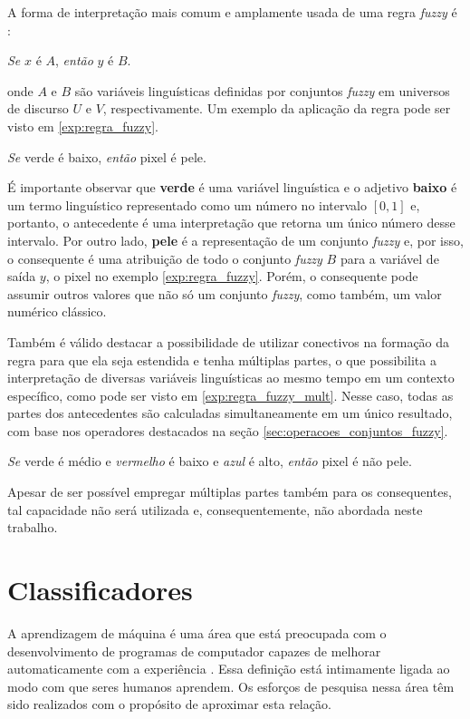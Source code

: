 A forma de interpretação mais comum e amplamente usada de uma regra \emph{fuzzy} é \citep{dubois:96}:
\begin{center}
\emph{Se} $x$ é $A$, \emph{então} $y$ é $B$.
\end{center}
\noindent onde $A$ e $B$ são variáveis linguísticas definidas por conjuntos \emph{fuzzy} em universos de discurso $U$ e $V$, respectivamente. Um exemplo da aplicação da regra pode ser visto em \ref{exp:regra_fuzzy}.

\begin{exmp}
\label{exp:regra_fuzzy}
\emph{Se} verde é baixo, \emph{então} pixel é pele.
\end{exmp}

É importante observar que \textbf{verde} é uma variável linguística e o adjetivo \textbf{baixo} é um termo linguístico representado como um número no intervalo $[0, 1]$ e, portanto, o antecedente é uma interpretação que retorna um único número desse intervalo. Por outro lado, \textbf{pele} é a representação de um conjunto \emph{fuzzy} e, por isso, o consequente é uma atribuição de todo o conjunto \emph{fuzzy} $B$ para a variável de saída $y$, o pixel no exemplo \ref{exp:regra_fuzzy}. Porém, o consequente pode assumir outros valores que não só um conjunto \emph{fuzzy}, como também, um valor numérico clássico.

Também é válido destacar a possibilidade de utilizar conectivos na formação da regra para que ela seja estendida e tenha múltiplas partes, o que possibilita a interpretação de diversas variáveis linguísticas ao mesmo tempo em um contexto específico, como pode ser visto em \ref{exp:regra_fuzzy_mult}. Nesse caso, todas as partes dos antecedentes são calculadas simultaneamente em um único resultado, com base nos operadores destacados na seção \ref{sec:operacoes_conjuntos_fuzzy}.

\begin{exmp}
\label{exp:regra_fuzzy_mult}
\emph{Se} verde é médio e \emph{vermelho} é baixo e \emph{azul} é alto, \emph{então} pixel é não pele.
\end{exmp}

Apesar de ser possível empregar múltiplas partes também para os consequentes, tal capacidade não será utilizada e, consequentemente, não abordada neste trabalho.


\section{Classificadores}
\label{sec:classificadores}
A aprendizagem de máquina é uma área que está preocupada com o desenvolvimento de programas de computador capazes de melhorar automaticamente com a experiência \citep{mitchell:97}. Essa definição está intimamente ligada ao modo com que seres humanos aprendem. Os esforços de pesquisa nessa área têm sido realizados com o propósito de aproximar esta relação.

